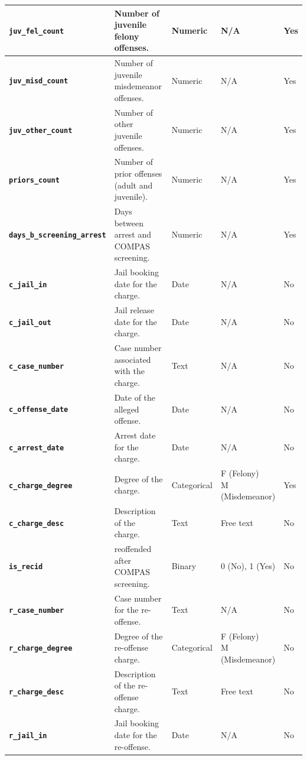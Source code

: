 \documentclass[conference]{IEEEtran}
\begin{document}
\begin{table}[!ht]
\begin{tabular}{|l|l|l|l|l|}
		\textbf{\texttt{juv\_fel\_count}}	&	Number of juvenile felony offenses.	&	Numeric	&	N/A	&	Yes \\ \hline
		\textbf{\texttt{juv\_misd\_count}}	&	Number of juvenile misdemeanor offenses.	&	Numeric	&	N/A	&	Yes \\ \hline
		\textbf{\texttt{juv\_other\_count}}	&	Number of other juvenile offenses.	&	Numeric	&	N/A	&	Yes \\ \hline
		\textbf{\texttt{priors\_count}}	&	Number of prior offenses (adult and juvenile).	&	Numeric	&	N/A	&	Yes \\ \hline
		\textbf{\texttt{days\_b\_screening\_arrest}}	&	Days between arrest and COMPAS screening.	&	Numeric	&	N/A	&	Yes \\ \hline
		\textbf{\texttt{c\_jail\_in}}	&	Jail booking date for the charge.	&	Date	&	N/A	&	No \\ \hline
		\textbf{\texttt{c\_jail\_out}}	&	Jail release date for the charge.	&	Date	&	N/A	&	No \\ \hline
		\textbf{\texttt{c\_case\_number}}	&	Case number associated with the charge.	&	Text	&	N/A	&	No \\ \hline
		\textbf{\texttt{c\_offense\_date}}	&	Date of the alleged offense.	&	Date	&	N/A	&	No \\ \hline
		\textbf{\texttt{c\_arrest\_date}}	&	Arrest date for the charge.	&	Date	&	N/A	&	No \\ \hline
		\textbf{\texttt{c\_charge\_degree}}	&	Degree of the charge.	&	Categorical	&	\makecell[l]{F (Felony)\\M (Misdemeanor)}	&	Yes \\ \hline
		\textbf{\texttt{c\_charge\_desc}}	&	Description of the charge.	&	Text	&	Free text	&	No \\ \hline
		\textbf{\texttt{is\_recid}}	&	reoffended after COMPAS screening.	&	Binary	&	0 (No), 1 (Yes)	&	No \\ \hline
		\textbf{\texttt{r\_case\_number}}	&	Case number for the re-offense.	&	Text	&	N/A	&	No \\ \hline
		\textbf{\texttt{r\_charge\_degree}}	&	Degree of the re-offense charge.	&	Categorical	&	\makecell[l]{F (Felony)\\M (Misdemeanor)}	&	No \\ \hline
		\textbf{\texttt{r\_charge\_desc}}	&	Description of the re-offense charge.	&	Text	&	Free text	&	No \\ \hline
		\textbf{\texttt{r\_jail\_in}}	&	Jail booking date for the re-offense.	&	Date	&	N/A	&	No \\ \hline

\end{tabular}
\end{table}
\end{document}
